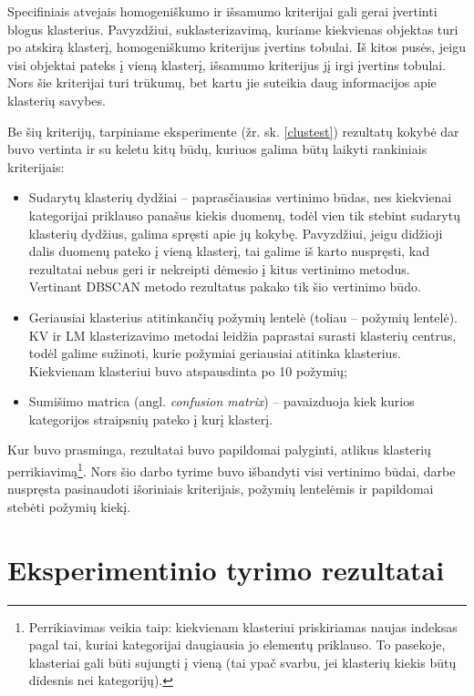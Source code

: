 \documentclass{VUMIFInfBakalaurinis}
\begin{document}
Specifiniais atvejais homogeniškumo ir išsamumo kriterijai gali gerai
įvertinti blogus klasterius. Pavyzdžiui, suklasterizavimą, kuriame
kiekvienas objektas turi po atskirą klasterį, homogeniškumo kriterijus
įvertins tobulai. Iš kitos pusės, jeigu visi objektai pateks į vieną
klasterį, išsamumo kriterijus jį irgi įvertins tobulai. Nors šie
kriterijai turi trūkumų, bet kartu jie suteikia daug informacijos apie
klasterių savybes.

Be šių kriterijų, tarpiniame eksperimente (žr. sk. \ref{clustest}) rezultatų kokybė dar buvo vertinta ir su keletu
kitų būdų, kuriuos galima būtų laikyti rankiniais kriterijais:

\begin{itemize}
\item
  Sudarytų klasterių dydžiai -- paprasčiausias vertinimo būdas, nes
  kiekvienai kategorijai priklauso panašus kiekis duomenų, todėl vien
  tik stebint sudarytų klasterių dydžius, galima spręsti apie jų kokybę.
  Pavyzdžiui, jeigu didžioji dalis duomenų pateko į vieną klasterį, tai
  galime iš karto nuspręsti, kad rezultatai nebus geri ir nekreipti
  dėmesio į kitus vertinimo metodus. Vertinant DBSCAN metodo rezultatus
  pakako tik šio vertinimo būdo.
\item
  Geriausiai klasterius atitinkančių požymių lentelė (toliau -- požymių
  lentelė). KV ir LM klasterizavimo metodai leidžia paprastai surasti
  klasterių centrus, todėl galime sužinoti, kurie požymiai geriausiai
  atitinka klasterius. Kiekvienam klasteriui buvo atspausdinta po 10
  požymių;
\item
  Sumišimo matrica (angl. \emph{confusion matrix}) -- pavaizduoja kiek
  kurios kategorijos straipsnių pateko į kurį klasterį.
\end{itemize}

Kur buvo prasminga, rezultatai buvo papildomai palyginti, atlikus
klasterių perrikiavimą\footnote{Perrikiavimas veikia taip: kiekvienam
  klasteriui priskiriamas naujas indeksas pagal tai, kuriai kategorijai
  daugiausia jo elementų priklauso. To pasekoje, klasteriai gali būti
  sujungti į vieną (tai ypač svarbu, jei klasterių kiekis būtų
  didesnis nei kategorijų).}. Nors šio darbo tyrime buvo išbandyti visi
vertinimo būdai, darbe nuspręsta pasinaudoti išoriniais kriterijais,
požymių lentelėmis ir papildomai stebėti požymių kiekį.

\section{Eksperimentinio tyrimo rezultatai}
\end{document}
